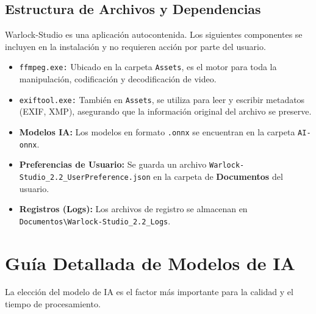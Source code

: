 \documentclass[11pt, a4paper]{article}
\newcommand{\inlinecode}[1]{\colorbox{WarlockLightGray}{\small\texttt{#1}}}
\begin{document}
\subsection{Estructura de Archivos y Dependencias}
\begin{infobox}
Warlock-Studio es una aplicación autocontenida. Los siguientes componentes se incluyen en la instalación y no requieren acción por parte del usuario.
\end{infobox}
\begin{itemize}[leftmargin=*]
    \item \inlinecode{ffmpeg.exe:} Ubicado en la carpeta \texttt{Assets}, es el motor para toda la manipulación, codificación y decodificación de video.
    \item \inlinecode{exiftool.exe:} También en \texttt{Assets}, se utiliza para leer y escribir metadatos (EXIF, XMP), asegurando que la información original del archivo se preserve.
    \item \textbf{Modelos IA:} Los modelos en formato \texttt{.onnx} se encuentran en la carpeta \texttt{AI-onnx}.
    \item \textbf{Preferencias de Usuario:} Se guarda un archivo \inlinecode{Warlock-Studio_2.2_UserPreference.json} en la carpeta de \textbf{Documentos} del usuario.
    \item \textbf{Registros (Logs):} Los archivos de registro se almacenan en \texttt{Documentos\textbackslash Warlock-Studio_2.2_Logs}.
\end{itemize}


\section{Guía Detallada de Modelos de IA}
La elección del modelo de IA es el factor más importante para la calidad y el tiempo de procesamiento.
\end{document}
